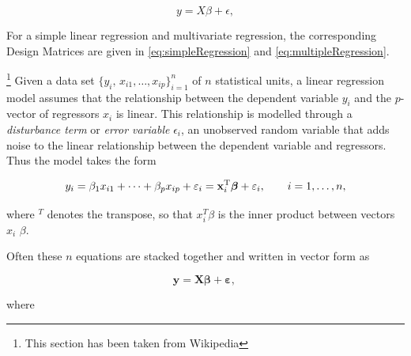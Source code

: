 \begin{equation*}
    y=X\beta+ \epsilon,
\end{equation*}

For a simple linear regression and multivariate regression, the corresponding Design Matrices are given in \ref{eq:simpleRegression} and \ref{eq:multipleRegression}.

\footnote{This section has been taken from Wikipedia} Given a data set $\{y_i,\, x_{i1}, \ldots, x_{ip}\}_{i=1}^n$ of $n$ statistical units, a linear regression model assumes that the relationship between the dependent variable $y_i$ and the $p$-vector of regressors $x_i$ is linear. This relationship is modelled through a \emph{disturbance term} or \emph{error variable} $\epsilon_i$, an unobserved random variable that adds noise to the linear relationship between the dependent variable and regressors. Thus the model takes the form

\begin{equation}\label{eq:regression}
   y_i = \beta_1   x_{i1} + \cdots + \beta_p x_{ip} + \varepsilon_i
   = \mathbf{x}^{\rm T}_i\boldsymbol\beta + \varepsilon_i,
   \qquad i = 1, \ldots, n,
\end{equation}

where $^T$ denotes the transpose, so that $x_i^T\beta$ is the inner product between vectors $x_i$ $\beta$.

Often these $n$ equations are stacked together and written in vector form as

\begin{equation}
  \mathbf{y} = \mathbf{X}\boldsymbol\beta + \boldsymbol\varepsilon, \,
\end{equation}

where

